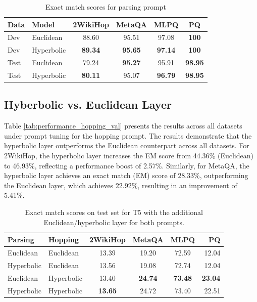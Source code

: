 \documentclass[11pt]{article}
\begin{document}
\begin{table}
\centering
\small
\setlength{\tabcolsep}{3.0pt}
\begin{tabularx}{\columnwidth}{Xlcccc}
\toprule
Data & Model & 2WikiHop & MetaQA & MLPQ & PQ \\ 
\midrule
Dev&Euclidean & 88.60 & 95.51 & 97.08 & \textbf{100} \\ 
Dev&Hyperbolic & \textbf{89.34} & \textbf{95.65} & \textbf{97.14} & \textbf{100} \\ 
\midrule
Test&Euclidean & 79.24 & \textbf{95.27} & 95.91 & \textbf{98.95}\\ 
Test&Hyperbolic & \textbf{80.11} & 95.07 & \textbf{96.79} & \textbf{98.95}\\ 
\bottomrule
\end{tabularx}
\caption{Exact match scores for parsing prompt}
\label{tab:performance_parsing_val}
\end{table}

\subsection{Hyberbolic vs. Euclidean Layer} 
Table \ref{tab:performance_hopping_val} presents the results across all datasets under prompt tuning for the hopping prompt. The results demonstrate that the hyperbolic layer outperforms the Euclidean counterpart across all datasets. For 2WikiHop, the hyperbolic layer increases the EM score from 44.36\% (Euclidean) to 46.93\%, reflecting a performance boost of 2.57\%. Similarly, for MetaQA, the hyperbolic layer achieves an exact match (EM) score of 28.33\%, outperforming the Euclidean layer, which achieves 22.92\%, resulting in an improvement of 5.41\%.

\begin{table}
\centering
\small
\setlength{\tabcolsep}{1.5pt}
\begin{tabularx}{\columnwidth}{llcccr}
\toprule
Parsing & Hopping & 2WikiHop & MetaQA & MLPQ & PQ \\ \midrule
Euclidean & Euclidean & 13.39 & 19.20 & 72.59 & 12.04 \\
Hyperbolic & Euclidean & 13.56 & 19.08 & 72.74 & 12.04 \\
Euclidean & Hyperbolic & 13.40 & \textbf{24.74} &  \textbf{73.48} & \textbf{23.04} \\ 
Hyperbolic & Hyperbolic & \textbf{13.65} & 24.72 & 73.40 & 22.51 \\ \bottomrule
\end{tabularx}
\caption{Exact match scores on test set for T5 with the additional Euclidean/hyperbolic layer for both prompts.}
\label{tab:performance_test}
\end{table}
\end{document}
